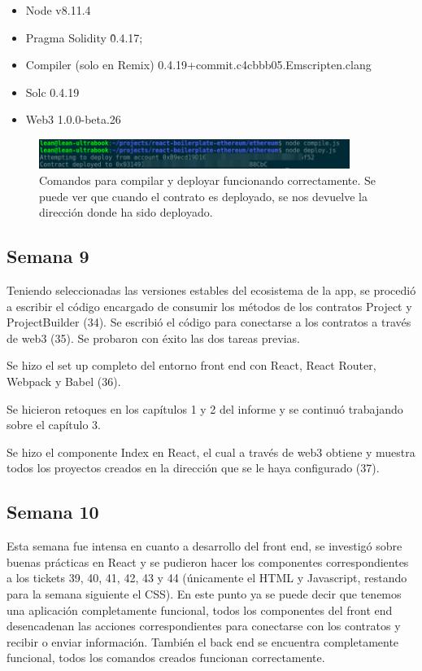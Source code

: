 \begin{itemize}
	\item Node v8.11.4
	\item Pragma Solidity \^0.4.17;
	\item Compiler (solo en Remix) 0.4.19+commit.c4cbbb05.Emscripten.clang
	\item Solc 0.4.19
	\item Web3 1.0.0-beta.26
\end{itemize}

\begin{figure}[htbp!] 
\centering    
\includegraphics[width=0.9\textwidth]{success-deploy}
\caption[successdeploy]{Comandos para compilar y deployar funcionando correctamente. Se puede ver que cuando el contrato es deployado, se nos devuelve la dirección donde ha sido deployado.}
\label{fig:success-deploy}
\end{figure}

\subsection{Semana 9}
Teniendo seleccionadas las versiones estables del ecosistema de la app, se procedió a escribir
el código encargado de consumir los métodos de los contratos Project y ProjectBuilder (34).
Se escribió el código para conectarse a los contratos a través de web3 (35). Se probaron con éxito
las dos tareas previas.

Se hizo el set up completo del entorno front end con React, React Router, Webpack y Babel (36).

Se hicieron retoques en los capítulos 1 y 2 del informe y se continuó trabajando sobre el capítulo
3.

Se hizo el componente Index en React, el cual a través de web3 obtiene y muestra todos los
proyectos creados en la dirección que se le haya configurado (37).

\subsection{Semana 10}
Esta semana fue intensa en cuanto a desarrollo del front end, se investigó sobre buenas prácticas
en React y se pudieron hacer los componentes correspondientes a los tickets 39, 40, 41, 42, 43
y 44 (únicamente el HTML y Javascript, restando para la semana siguiente el CSS). En este punto
ya se puede decir que tenemos una aplicación completamente funcional, todos los componentes del 
front end desencadenan las acciones correspondientes para conectarse con los contratos y recibir
o enviar información. También el back end se encuentra completamente funcional, todos los comandos
creados funcionan correctamente. 

